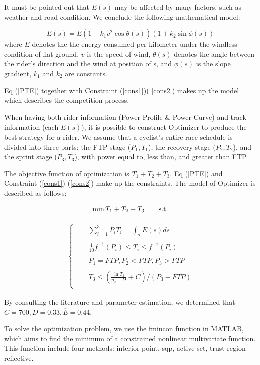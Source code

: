 \par It must be pointed out that $E(s)$ may be affected by many factors, such as weather and road condition. We conclude the following mathematical model:

\begin{equation}
	\label{E}
	E(s) = \overline{E}(1-k_1v^2\cos\theta(s))(1+k_2\sin\phi(s))
\end{equation}
where $\overline{E}$ denotes the the energy consumed per kilometer under the windless condition of flat ground, $v$ is the speed of wind, $\theta(s)$ denotes the angle between the rider's direction and the wind at position of s, and $\phi(s)$ is the slope gradient, $k_1$ and $k_2$ are constants.

\par Eq (\ref{PTE}) together with Constraint (\ref{cons1})( \ref{cons2}) makes up the model which describes the competition process.

\par When having both rider information (Power Profile \& Power Curve) and track information (each $E(s)$), it is possible to construct Optimizer to produce the best strategy for a rider. We assume that a cyclist's entire race schedule is divided into three parts: the FTP stage ($P_1,T_1$), the recovery stage ($P_2,T_2$), and the sprint stage ($P_3,T_3$), with power equal to, less than, and greater than FTP.
\par The objective function of optimization is $T_1+T_2+T_3$. Eq (\ref{PTE}) and Constraint (\ref{cons1}) (\ref{cons2}) make up the constraints. The model of Optimizer is described as follows:

\begin{equation}
	\min T_1+T_2+T_3 \quad\quad \rm{s.t.}
	\label{min}
\end{equation}

\begin{equation}\label{cons3}
\begin{split}
		\left\{
		\begin{aligned}
				&\sum_{i=1}^{3}P_iT_i= \int_{\sigma }^{}E(s)ds \\
				\quad \\
			&\frac{1}{10} f^{-1}(P_i)\leq T_i \leq f^{-1}(P_i)\\
				\quad\\
				&P_1=FTP,P_2<FTP,P_3>FTP\\
				\quad \\
				&T_3 \le ({\frac{\ln T_2}{p_2+D}+C})/{(P_3-FTP)}\\
				\end{aligned}
	\right.
\end{split}
\end{equation}
\par By consulting the literature and parameter estimation, we determined that $C=700,D=0.33,\overline{E}=0.44$.
\par To solve the optimization problem, we use the fmincon function in MATLAB, which aims to find the minimum of a constrained nonlinear multivariate function. This function include four methods: interior-point, sqp, active-set, trust-region-reflective.
